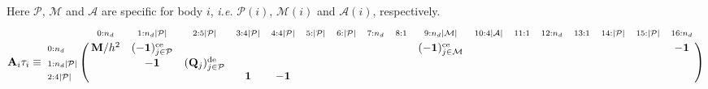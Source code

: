 \documentclass[a4paper,10pt]{article}
\begin{document}
\begin{landscape}
Here $\mathcal{P}$, $\mathcal{M}$ and $\mathcal{A}$ are specific for body $i$,
\emph{i.e.} $\mathcal{P}(i)$, $\mathcal{M}(i)$ and $\mathcal{A}(i)$, respectively.
\begin{equation}\notag
\mathbf{A}_i \tau_i
\equiv
\bordermatrix{
                                     &    \scriptstyle{0 : n_d}                      &              \scriptstyle{1 : n_d |\mathcal{P}|}          &        \scriptstyle{2 : 5 |\mathcal{P}|}               &  \scriptstyle{3 : 4 |\mathcal{P}|}                      & \scriptstyle{4 : 4|\mathcal{P}|}    &   \scriptstyle{5 : |\mathcal{P}| }  & \scriptstyle{6 : |\mathcal{P}| }  & \scriptstyle{7 : n_d}  &   \scriptstyle{8 : 1 } & \scriptstyle{9 : n_d |\mathcal{M}| }             & \scriptstyle{10: 4 |\mathcal{A}| }    &  \scriptstyle{11:1}        & \scriptstyle{12:n_d}   & \scriptstyle{13:1}   & \scriptstyle{14:|\mathcal{P}|}  & \scriptstyle{15:|\mathcal{P}|}   &  \scriptstyle{16:n_d}    \cr
\scriptstyle{ 0:n_d}                 &  \mathbf{M}/h^2                               & (-\mathbf{1})_{j \in \mathcal{P}}^\text{ce}               &                                                        &                                                         &                                     &                                     &                                   &                        &                        & (-\mathbf{1})_{j \in \mathcal{M}}^\text{ce}      &                                       &                            &                        &                      &                                 &                                  &      \mathbf{-1}         \cr
\scriptstyle{ 1:n_d |\mathcal{P}|}   &                                               &  -\mathbf{1}                                              &  (\mathbf{Q}_j)_{j \in \mathcal{P}}^\text{de}          &                                                         &                                     &                                     &                                   &                        &                        &                                                  &                                       &                            &                        &                      &                                 &                                  &                          \cr
\scriptstyle{ 2:4 |\mathcal{P}|}     &                                               &                                                           &                                                        &  \mathbf{1}                                             &  -\mathbf{1}                        &                                     &                                   &                        &                        &                                                  &                                       &                            &                        &                      &                                 &                                  &                          \cr
}
\end{equation}
\end{landscape}
\end{document}
